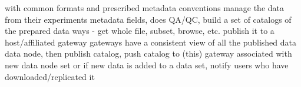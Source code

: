\documentclass[times]{cpeauth}
\begin{document}
with common formats and prescribed metadata conventions
manage the data from their experiments
metadata fields, does QA/QC, build a set of catalogs of the prepared data
ways - get whole file, subset, browse, etc.
publish it to a host/affiliated gateway
gateways have a consistent view of all the published data
data node, then publish catalog, push catalog to (this) gateway associated with
new data node
set or if new data is added to a data set, notify users who have
downloaded/replicated it
\end{document}

